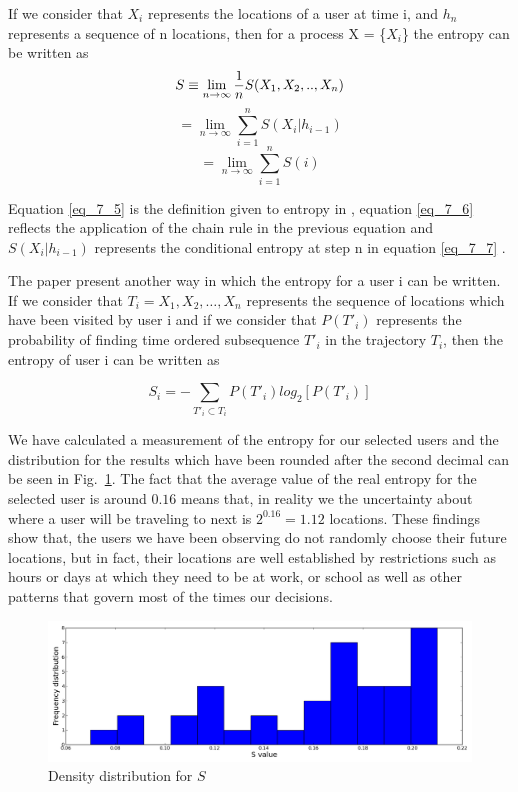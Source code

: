 If we consider that $X_{i}$ represents the locations of a user at time i,
and $h_{n}$ represents a sequence of n locations, then for a process X =
\{$X_{i}$\} the entropy can be written as
\begin{equation}
\label{eq_7_5}
S \equiv \lim_{n\to\infty} {1 \over n}S(X_{1},X_{2},..,X_{n})
\end{equation} 
\begin{equation}
\label{eq_7_6}
= \lim_{n\to\infty} \sum\limits_{i=1}^{n} S(X_{i}|h_{i-1})
\end{equation}
\begin{equation}
\label{eq_7_7}
= \lim_{n\to\infty} \sum\limits_{i=1}^{n} S(i)
\end{equation}

Equation \ref{eq_7_5} is the definition given to entropy in
\cite{Cover:2006:EIT:1146355}, equation \ref{eq_7_6} reflects the application of
the chain rule in the previous equation and $S(X_{i}|h_{i-1})$ represents the
conditional entropy at step n in equation \ref{eq_7_7} \cite{song2010limits}.

The paper \cite{Barabasi10} present another way in which the entropy for a user
i can be written. If we consider that $T_{i} = {X_{1}, X_{2},\ldots, X_{n}}$
represents the sequence of locations which have been visited by user i and if we
consider that $P(T'_{i})$ represents the probability of finding time ordered
subsequence $T'_{i}$ in the trajectory $T_{i}$, then the entropy of user i can
be written as

\begin{equation}
S_{i} = - \sum\limits_{T'_{i}\subset T_{i}}P(T'_{i})log_{2}[P(T'_{i})]
\end{equation}

We have calculated a measurement of the entropy for our selected users and the
distribution for the results which have been rounded after the second decimal
can be seen in Fig.~\ref{dis_full_e}. The fact that the average value of the
real entropy for the selected user is around $0.16$ means that, in reality we
the uncertainty about where a user will be traveling to next is $2^{0.16} =
1.12$ locations. These findings show that, the users we have been observing do
not randomly choose their future locations, but in fact, their locations are
well established by restrictions such as hours or days at which they need to be
at work, or school as well as other patterns that govern most of the times our
decisions.

\begin{figure}[!h]
\centering
\includegraphics[width=\textwidth]{figures/entro_pred/full_entro_distrib.png}
\caption{Density distribution for $S$}
\label{dis_full_e}
\end{figure}

